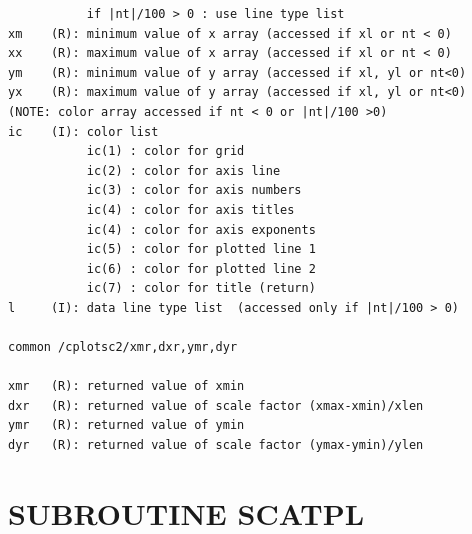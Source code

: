 \documentclass[11pt]{report}
\begin{document}
\begin{verbatim}
           if |nt|/100 > 0 : use line type list
xm    (R): minimum value of x array (accessed if xl or nt < 0)
xx    (R): maximum value of x array (accessed if xl or nt < 0)
ym    (R): minimum value of y array (accessed if xl, yl or nt<0)
yx    (R): maximum value of y array (accessed if xl, yl or nt<0)
(NOTE: color array accessed if nt < 0 or |nt|/100 >0)
ic    (I): color list
           ic(1) : color for grid
           ic(2) : color for axis line
           ic(3) : color for axis numbers
           ic(4) : color for axis titles
           ic(4) : color for axis exponents
           ic(5) : color for plotted line 1
           ic(6) : color for plotted line 2
           ic(7) : color for title (return)
l     (I): data line type list  (accessed only if |nt|/100 > 0)

common /cplotsc2/xmr,dxr,ymr,dyr

xmr   (R): returned value of xmin
dxr   (R): returned value of scale factor (xmax-xmin)/xlen
ymr   (R): returned value of ymin
dyr   (R): returned value of scale factor (ymax-ymin)/ylen
\end{verbatim}

\newpage
\section{SUBROUTINE SCATPL}
\end{document}
